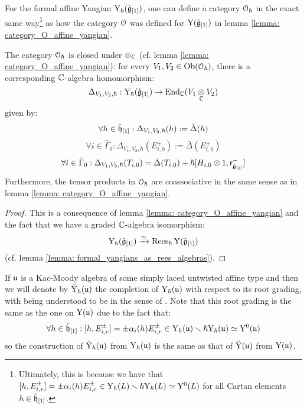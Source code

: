        \begin{lemma} \label{lemma: category_O_formal_affine_yangian}
            For the formal affine Yangian $\mathrm{Y}_{\hbar}(\hat{\mathfrak{g}}_{[1]})$, one can define a category $\mathcal{O}_{\hbar}$ in the exact same way\footnote{Ultimately, this is because we have that $[h, E_{i, r}^{\pm}] = \pm \alpha_i(h) E_{i, r}^{\pm} \in \mathrm{Y}_{\hbar}(L) \smallsetminus \hbar\mathrm{Y}_{\hbar}(L) \simeq \mathrm{Y}^0(L)$ for all Cartan elements $h \in \hat{\mathfrak{h}}_{[1]}$.} as how the category $\mathcal{O}$ was defined for $\mathrm{Y}(\hat{\mathfrak{g}}_{[1]})$ in lemma \ref{lemma: category_O_affine_yangian}. 

            The category $\mathcal{O}_{\hbar}$ is closed under $\tensor_{\bbC}$ (cf. lemma \ref{lemma: category_O_affine_yangian}): for every $V_1, V_2 \in \mathrm{Ob}(\mathcal{O}_{\hbar})$, there is a corresponding $\mathbb{C}$-algebra homomorphism:
                $$\Delta_{V_1, V_2, \hbar}: \rmY_{\hbar}(\hat{\g}_{[1]}) \to \End_{\bbC}(V_1 \tensor_{\bbC} V_2)$$
            given by:
                $$\forall h \in \hat{\mathfrak{h}}_{[1]}: \Delta_{V_1, V_2, \hbar}(h) := \bar{\Delta}(h)$$
                $$\forall i \in \hat{\Gamma}_0: \Delta_{V_1, V_2, \hbar}(E_{i, 0}^{\pm}) := \bar{\Delta}(E_{i, 0}^{\pm})$$
                $$\forall i \in \hat{\Gamma}_0: \Delta_{V_1, V_2, \hbar}(T_{i, 0}) = \bar{\Delta}(T_{i, 0}) + \hbar [H_{i, 0} \tensor 1, \sfr_{ \hat{\g}_{[1]} }^- ]$$
            Furthermore, the tensor products in $\mathcal{O}_{\hbar}$ are coassociative in the same sense as in lemma \ref{lemma: category_O_affine_yangian}.
        \end{lemma}
            \begin{proof}
                This is a consequence of lemma \ref{lemma: category_O_affine_yangian} and the fact that we have a graded $\mathbb{C}$-algebra isomorphism:
                    $$\mathrm{Y}_{\hbar}(\hat{\mathfrak{g}}_{[1]}) \xrightarrow[]{\simeq} \operatorname{Rees}_{\hbar} \mathrm{Y}(\hat{\mathfrak{g}}_{[1]})$$
                (cf. lemma \ref{lemma: formal_yangians_as_rees_algebras}).
            \end{proof}
        \begin{convention}
            If $\mathfrak{u}$ is a Kac-Moody algebra of some simply laced untwisted affine type and then we will denote by $\breve{\mathrm{Y}}_{\hbar}(\mathfrak{u})$ the completion of $\mathrm{Y}_{\hbar}(\mathfrak{u})$ with respect to its root grading, with  being understood to be in the sense of \cite[Appendix A]{wendlandt_formal_shift_operators_on_yangian_doubles}. Note that this root grading is the same as the one on $\mathrm{Y}(\mathfrak{u})$ due to the fact that:
                $$\forall h \in \hat{\mathfrak{h}}_{[1]}: [h, E_{i, r}^{\pm}] = \pm \alpha_i(h) E_{i, r}^{\pm} \in \mathrm{Y}_{\hbar}(\mathfrak{u}) \smallsetminus \hbar\mathrm{Y}_{\hbar}(\mathfrak{u}) \simeq \mathrm{Y}^0(\mathfrak{u})$$
            so the construction of $\breve{\mathrm{Y}}_{\hbar}(\mathfrak{u})$ from $\mathrm{Y}_{\hbar}(\mathfrak{u})$ is the same as that of $\breve{\mathrm{Y}}(\mathfrak{u})$ from $\mathrm{Y}(\mathfrak{u})$.
        \end{convention}

